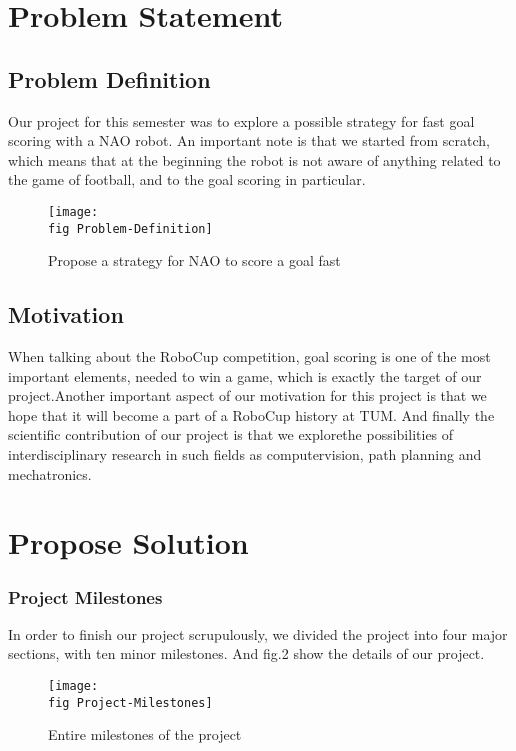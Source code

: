 \section{Problem Statement}
\label{j sec turning to ball}
\subsection*{Problem Definition}
Our project for this semester was to explore a possible strategy for fast goal
scoring with a NAO robot. An important note is that we started from scratch,
which means that at the beginning the robot is not aware of anything related to
the game of football, and to the goal scoring in particular.

\begin{figure}[ht]
	\texttt{[image: \\fig Problem-Definition]}
	\caption{Propose a strategy for NAO to score a goal fast}
	\label{j figure turn to ball}
\end{figure}


\subsection*{Motivation}
When talking about the RoboCup
competition, goal scoring is one of the
most important elements, needed to win a game, which is exactly the target of our project.Another important aspect of our motivation for this project is that we hope that it will become a part of a RoboCup history at TUM. And finally the scientific contribution of our project is that we explorethe possibilities of interdisciplinary research in such fields as computervision, path planning and mechatronics.

 
\section{Propose Solution}
\subsubsection*{Project Milestones}
\label{j sec ball detection} 

In order to finish our project scrupulously, we divided the project into four major sections, with ten minor milestones. And fig.2 show the details of our project. 

 
\begin{figure}[ht]
	\texttt{[image: \\fig Project-Milestones]}
	\caption{Entire milestones of the project}
	\label{j figure turn to ball}
\end{figure}

